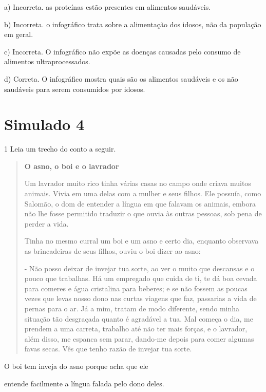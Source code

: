 \begin{esscolha}
\begin{esscolha}
\begin{esscolha}
a)  Incorreta. as proteínas estão presentes em alimentos saudáveis.

b)  Incorreta. o infográfico trata sobre a alimentação dos idosos, não
da população em geral.

c)  Incorreta. O infográfico não expõe as doenças causadas pelo consumo
de alimentos ultraprocessados.

d)  Correta. O infográfico mostra quais são os alimentos saudáveis e os
não saudáveis para serem consumidos por idosos.

\chapter{Simulado 4}

\num{1} Leia um trecho do conto a seguir.

\begin{quote}
\textbf{O asno, o boi e o lavrador}

Um lavrador muito rico tinha várias casas no campo onde criava muitos
animais. Vivia em uma delas com a mulher e seus filhos. Ele possuía,
como Salomão, o dom de entender a língua em que falavam os animais,
embora não lhe fosse permitido traduzir o que ouvia às outras pessoas,
sob pena de perder a vida.

Tinha no mesmo curral um boi e um asno e certo dia, enquanto observava
as brincadeiras de seus filhos, ouviu o boi dizer ao asno:

- Não posso deixar de invejar tua sorte, ao ver o muito que descansas e
o pouco que trabalhas. Há um empregado que cuida de ti, te dá boa cevada
para comeres e água cristalina para beberes; e se não fossem as poucas
vezes que levas nosso dono nas curtas viagens que faz, passarias a vida
de pernas para o ar. Já a mim, tratam de modo diferente, sendo minha
situação tão desgraçada quanto é agradável a tua. Mal começa o dia, me
prendem a uma carreta, trabalho até não ter mais forças, e o lavrador,
além disso, me espanca sem parar, dando-me depois para comer algumas
favas secas. Vês que tenho razão de invejar tua sorte.

\end{quote}

O boi tem inveja do asno porque acha que ele

\begin{esscolha}
\item entende facilmente a língua falada pelo dono deles.


\end{esscolha}
\end{esscolha}
\end{esscolha}
\end{esscolha}
